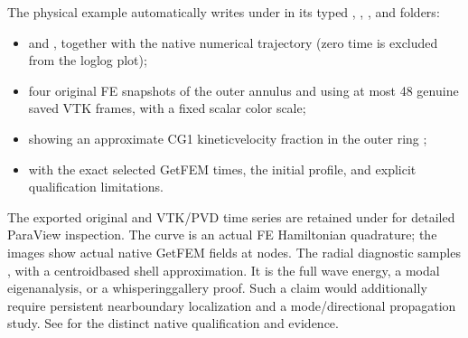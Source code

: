 \documentclass[letterpaper,10pt,english]{sphinxmanual}
\begin{document}
\sphinxAtStartPar
The physical example automatically
writes under  in its typed
, , ,
 and  folders:
\begin{itemize}
\item {} 
\sphinxAtStartPar
{} and
, together with the native
 numerical
trajectory (zero time is excluded
 from the log\sphinxhyphen{}log plot);

\item {} 
\sphinxAtStartPar
four original FE  snapshots
of the outer annulus and
 using
at most 48 genuine saved VTK frames,
with a fixed scalar color scale;

\item {} 
\sphinxAtStartPar
{}
showing an approximate CG1
kinetic\sphinxhyphen{}velocity fraction in
the outer ring ;

\item {} 
\sphinxAtStartPar
{} with the
exact selected GetFEM times,
the initial profile, and explicit
qualification limitations.

\end{itemize}

\sphinxAtStartPar
The exported original  and 
VTK/PVD time series are
retained under 
for detailed ParaView inspection. The  curve is an
actual FE Hamiltonian quadrature;
the images show actual native
GetFEM fields at nodes.
The radial diagnostic samples , with a
centroid\sphinxhyphen{}based shell approximation.
It is  the full wave energy,
a modal eigenanalysis, or a
whispering\sphinxhyphen{}gallery proof. Such a
claim would additionally require
persistent near\sphinxhyphen{}boundary localization
and a mode/directional propagation
study. See
for the distinct native qualification
and evidence.
\end{document}
